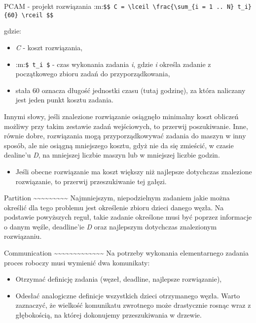 \documentclass[ignorenonframetext,]{beamer}
\begin{document}
\begin{frame}[fragile]
\begin{block}{PCAM - projekt rozwiązania}
:m:\texttt{\$\$ C = \textbackslash{}lceil \textbackslash{}frac\{\textbackslash{}sum\_\{i = 1 .. N\} t\_i\}\{60\} \textbackslash{}rceil \$\$}

gdzie:

\begin{itemize}
\item
  \emph{C} - koszt rozwiązania,
\item
  :m:\texttt{\$ t\_i \$} - czas wykonania zadania \emph{i}, gdzie
  \emph{i} określa zadanie z początkowego zbioru zadań do
  przyporządkowania,
\item
  stała 60 oznacza długość jednostki czasu (tutaj godzinę), za która
  naliczany jest jeden punkt kosztu zadania.
\end{itemize}

Innymi słowy, jeśli znalezione rozwiązanie osiągnęło minimalny koszt
obliczeń możliwy przy takim zestawie zadań wejściowych, to przerwij
poszukiwanie. Inne, równie dobre, rozwiązania mogą przyporządkowywać
zadania do maszyn w inny sposób, ale nie osiągną mniejszego kosztu, gdyż
nie da się zmieścić, w czasie dealine'u \emph{D}, na mniejszej liczbie
maszyn lub w mniejszej liczbie godzin.

\begin{itemize}
\item
  Jeśli obecne rozwiązanie ma koszt większy niż najlepsze dotychczas
  znalezione rozwiązanie, to przerwij przeszukiwanie tej gałęzi.
\end{itemize}

Partition
\textasciitilde{}\textasciitilde{}\textasciitilde{}\textasciitilde{}\textasciitilde{}\textasciitilde{}\textasciitilde{}\textasciitilde{}\textasciitilde{}
Najmniejszym, niepodzielnym zadaniem jakie można określić dla tego
problemu jest określenie zbioru dzieci danego węzła. Na podstawie
powyższych reguł, takie zadanie określone musi być poprzez informacje o
danym węźle, deadline'ie \emph{D} oraz najlepszym dotychczas znalezionym
rozwiązaniu.

Communication
\textasciitilde{}\textasciitilde{}\textasciitilde{}\textasciitilde{}\textasciitilde{}\textasciitilde{}\textasciitilde{}\textasciitilde{}\textasciitilde{}\textasciitilde{}\textasciitilde{}\textasciitilde{}\textasciitilde{}
Na potrzeby wykonania elementarnego zadania proces roboczy musi wymienić
dwa komunikaty:

\begin{itemize}
\item
  Otrzymać definicję zadania (węzeł, deadline, najlepsze rozwiązanie),
\item
  Odesłać analogiczne definicje wszystkich dzieci otrzymanego węzła.
  Warto zaznaczyć, że wielkość komunikatu zwrotnego może drastycznie
  rosnąc wraz z głębokością, na której dokonujemy przeszukiwania w
  drzewie.
\end{itemize}


\end{block}
\end{frame}
\end{document}
